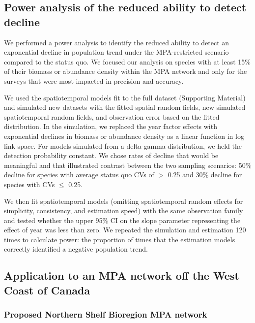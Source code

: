 \documentclass[12pt]{article}
\begin{document}
\subsection*{Power analysis of the reduced ability to detect decline}

We performed a power analysis to identify the reduced ability to detect an exponential decline in population trend under the MPA-restricted scenario compared to the status quo.
We focused our analysis on species with at least 15\% of their biomass or abundance density within the MPA network and only for the surveys that were most impacted in precision and accuracy.

We used the spatiotemporal models fit to the full dataset (Supporting Material) and simulated new datasets with the fitted spatial random fields, new simulated spatiotemporal random fields, and observation error based on the fitted distribution.
In the simulation, we replaced the year factor effects with exponential declines in biomass or abundance density as a linear function in log link space.
For models simulated from a delta-gamma distribution, we held the detection probability constant.
We chose rates of decline that would be meaningful and that illustrated contrast between the two sampling scenarios: 50\% decline for species with average status quo CVs of $>$ 0.25 and 30\% decline for species with CVs $\le$ 0.25.

We then fit spatiotemporal models (omitting spatiotemporal random effects for simplicity, consistency, and estimation speed) with the same observation family and tested whether the upper 95\% CI on the slope parameter representing the effect of year was less than zero.
We repeated the simulation and estimation 120 times to calculate power: the proportion of times that the estimation models correctly identified a negative population trend.

\subsection*{Application to an MPA network off the West Coast of Canada}

\subsubsection*{Proposed Northern Shelf Bioregion MPA network}
\end{document}
